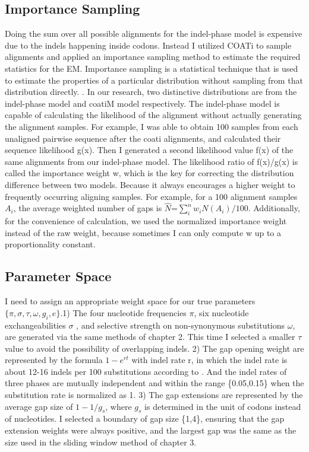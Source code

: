 \subsection{Importance Sampling}
Doing the sum over all possible alignments for the indel-phase model is expensive due to the indels happening inside codons. Instead I utilized COATi to sample alignments and applied an importance sampling method to estimate the required statistics for the EM. Importance sampling is a statistical technique that is used to estimate the properties of a particular distribution without sampling from that distribution directly. \parencite{kloek1978bayesian}. In our research, two distinctive distributions are from the indel-phase model and coatiM model respectively. The indel-phase model is capable of calculating the likelihood of the alignment without actually generating the alignment samples. For example, I was able to obtain 100 samples from each unaligned pairwise sequence after the coati alignments, and calculated their sequence likelihood g(x). Then I generated a second likelihood value f(x) of the same alignments from our indel-phase model. The likelihood ratio of f(x)/g(x) is called the importance weight w, which is the key for correcting the distribution difference between two models. Because it always encourages a higher weight to frequently occurring aligning samples. For example, for a 100 alignment samples $A_i$, the average weighted number of gaps  is $\hat N$=$\sum_{i}^n w_i N(A_i) /100$. Additionally, for the convenience of calculation, we used the normalized importance weight instead of the raw weight, because sometimes I can only compute w up to a proportionality constant. 

\subsection{Parameter Space}
I need to assign an appropriate weight space for our true parameters $\{\pi, \sigma, \tau, \omega, g_i, e\}$.1) The four nucleotide frequencies $\pi$, six nucleotide exchangeabilities $\sigma$ , and selective strength on non-synonymous substitutions $\omega$, are generated via the same methods of chapter 2. This time I selected a smaller $\tau$ value to avoid the possibility of overlapping indels. 2) The gap opening weight are represented by the formula $1-e^{r t}$ with indel rate r, in which the indel rate is about 12-16 indels per 100 substitutions according to \cite{cartwright2009problems}. And the indel rates of three phases are mutually independent and within the range \{0.05,0.15\} when the substitution rate is normalized as 1. 3) The gap extensions are represented by the average gap size of $1-1/g_s$, where $g_s$ is determined in the unit of codons instead of nucleotides. I selected a boundary of gap size \{1,4\}, ensuring that the gap extension weights were always positive, and the largest gap was the same as the size used in the sliding window method of chapter 3.  

